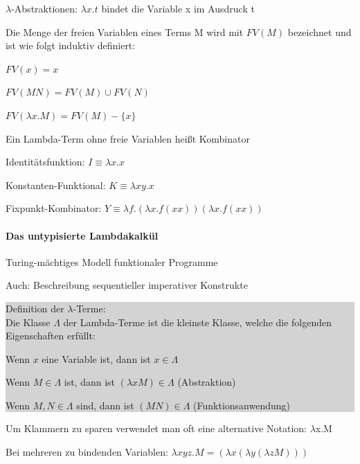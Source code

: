 \documentclass[10pt]{article}
\begin{document}
$\lambda$-Abstraktionen: $\lambda x. t$ bindet die Variable x im Ausdruck t

Die Menge der freien Variablen eines Terms M wird mit $FV(M)$ bezeichnet und ist wie folgt induktiv definiert:
\begin{itemize*}
  \item $FV(x)={x}$
  \item $FV(MN) = FV(M) \cup FV(N)$
  \item $FV(\lambda x.M) = FV(M) - \{x\}$
\end{itemize*}
Ein Lambda-Term ohne freie Variablen heißt Kombinator
\begin{itemize*}
  \item Identitätsfunktion: $I \equiv  \lambda x.x$
  \item Konstanten-Funktional: $K \equiv \lambda xy.x$
  \item Fixpunkt-Kombinator: $Y \equiv \lambda f.(\lambda x. f (x x)) (\lambda x. f (x x))$
\end{itemize*}

\paragraph{Das untypisierte Lambdakalkül}

\begin{itemize*}
  \item Turing-mächtiges Modell funktionaler Programme
  \item Auch: Beschreibung sequentieller imperativer Konstrukte
\end{itemize*}
\subitem\colorbox{lightgray}{
  \begin{minipage}[h]{0.9\linewidth}
    Definition der $\lambda$-Terme:\\
    Die Klasse $\Lambda$ der Lambda-Terme ist die kleinste Klasse, welche die folgenden Eigenschaften erfüllt: 
    \begin{itemize*}
      \item Wenn $x$ eine Variable ist, dann ist $x \in \Lambda$
      \item Wenn $M\in \Lambda$ ist, dann ist $(\lambda xM) \in \Lambda$ (Abstraktion)
      \item Wenn $M, N\in \Lambda$ sind, dann ist $(MN) \in \Lambda$ (Funktionsanwendung)
    \end{itemize*}
  \end{minipage}
}
\begin{itemize*}
  \item Um Klammern zu sparen verwendet man oft eine alternative Notation: $\lambda$x.M
  \item Bei mehreren zu bindenden Variablen: $\lambda xyz.M = (\lambda x(\lambda y(\lambda zM)))$
\end{itemize*}
\end{document}
